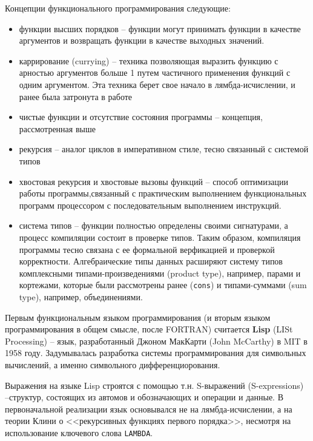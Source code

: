 \documentclass[a4paper,14pt]{extreport} %
\begin{document}
 Концепции функционального программирования следующие:
 \begin{itemize}
     \item функции высших порядков -- функции могут принимать функции в качестве аргументов и возвращать функции в качестве выходных значений.

         \item каррирование (currying) -- техника позволяющая выразить функцию с арностью аргументов больше 1 путем частичного применения функций с одним аргументом. Эта техника берет свое начало в лямбда-исчислении, и ранее была затронута в работе

     \item чистые функции и отсутствие состояния программы -- концепция, рассмотренная выше
     \item рекурсия -- аналог циклов в императивном стиле, тесно связанный с системой типов

         \item хвостовая рекурсия и хвостовые вызовы функций -- способ оптимизации работы программы,связанный с практическим выполнением функциональных программ процессором с последовательным выполнением инструкций.

     \item система типов -- функции полностью определены своими сигнатурами, а процесс компиляции состоит в проверке типов. Таким образом, компиляция программы тесно связана с ее формальной верфикацией и проверкой корректности. Алгебраические типы данных расширяют систему типов комплексными типами-произведениями (product type), например, парами и кортежами, которые были рассмотрены ранее (\texttt{cons}) и типами-суммами (sum type), например, объединениями.
 \end{itemize}


Первым функциональным языком программирования (и вторым языком программирования в общем смысле, после FORTRAN) считается \textbf{Lisp} (LISt Processing) -- язык, разработанный Джоном МакКарти (John McCarthy) в MIT в 1958 году. Задумывалась разработка системы программирования для символьных вычислений, а именно символьного дифференциорования.

Выражения на языке Lisp строятся с помощью т.н. S-выражений (S-expressions) --структур, состоящих из автомов и обозначающих и операции и данные. В первоначальной реализации язык основывался не на лямбда-исчислении, а на теории Клини о <<рекурсивных функциях первого порядка>>, несмотря на использование ключевого слова \texttt{LAMBDA}.
\end{document}
